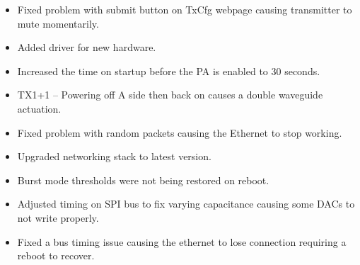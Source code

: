 \documentclass[letterpaper,10pt,english]{sphinxhowto}
\begin{document}
\begin{description}
\begin{itemize}
\item {} 
\sphinxAtStartPar
Fixed problem with submit button on TxCfg webpage causing transmitter to mute momentarily.

\end{itemize}

\begin{itemize}
\item {} 
\sphinxAtStartPar
Added driver for new hardware.

\end{itemize}

\begin{itemize}
\item {} 
\sphinxAtStartPar
Increased the time on startup before the PA is enabled to 30 seconds.

\end{itemize}

\begin{itemize}
\item {} 
\sphinxAtStartPar
TX1+1 – Powering oﬀ A side then back on causes a double waveguide actuation.

\end{itemize}

\begin{itemize}
\item {} 
\sphinxAtStartPar
Fixed problem with random packets causing the Ethernet to stop working.

\end{itemize}

\begin{itemize}
\item {} 
\sphinxAtStartPar
Upgraded networking stack to latest version.

\item {} 
\sphinxAtStartPar
Burst mode thresholds were not being restored on reboot.

\item {} 
\sphinxAtStartPar
Adjusted timing on SPI bus to ﬁx varying capacitance causing some DACs to not write properly.

\end{itemize}

\begin{itemize}
\item {} 
\sphinxAtStartPar
Fixed a bus timing issue causing the ethernet to lose connection requiring a reboot to recover.


\end{itemize}
\end{description}
\end{document}
